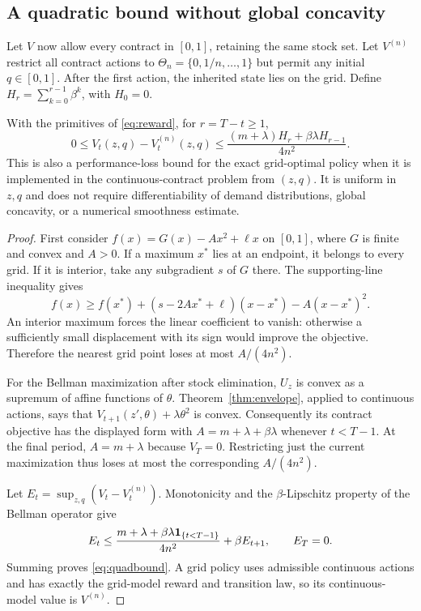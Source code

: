 \subsection{A quadratic bound without global concavity}\label{sec:grid}
Let $V$ now allow every contract in $[0,1]$, retaining the same stock set. Let $V^{(n)}$ restrict all contract actions to $\Theta_n=\{0,1/n,\ldots,1\}$ but permit any initial $q\in[0,1]$. After the first action, the inherited state lies on the grid. Define $H_r=\sum_{k=0}^{r-1}\beta^k$, with $H_0=0$.

\begin{theorem}\label{thm:quadratic}
With the primitives of \eqref{eq:reward}, for $r=T-t\geq1$,
\begin{equation}\label{eq:quadbound}
 0\leq V_t(z,q)-V_t^{(n)}(z,q)
 \leq\frac{(m+\lambda)H_r+\beta\lambda H_{r-1}}{4n^2}.
\end{equation}
This is also a performance-loss bound for the exact grid-optimal policy when it is implemented in the continuous-contract problem from $(z,q)$. It is uniform in $z,q$ and does not require differentiability of demand distributions, global concavity, or a numerical smoothness estimate.
\end{theorem}
\begin{proof}
First consider $f(x)=G(x)-A x^2+\ell x$ on $[0,1]$, where $G$ is finite and convex and $A>0$. If a maximum $x^*$ lies at an endpoint, it belongs to every grid. If it is interior, take any subgradient $s$ of $G$ there. The supporting-line inequality gives
\[
 f(x)\geq f(x^*)+(s-2Ax^*+\ell)(x-x^*)-A(x-x^*)^2.
\]
An interior maximum forces the linear coefficient to vanish: otherwise a sufficiently small displacement with its sign would improve the objective. Therefore the nearest grid point loses at most $A/(4n^2)$.

For the Bellman maximization after stock elimination, $U_z$ is convex as a supremum of affine functions of $\theta$. Theorem~\ref{thm:envelope}, applied to continuous actions, says that $V_{t+1}(z',\theta)+\lambda\theta^2$ is convex. Consequently its contract objective has the displayed form with $A=m+\lambda+\beta\lambda$ whenever $t<T-1$. At the final period, $A=m+\lambda$ because $V_T=0$. Restricting just the current maximization thus loses at most the corresponding $A/(4n^2)$.

Let $E_t=\sup_{z,q}(V_t-V_t^{(n)})$. Monotonicity and the $\beta$-Lipschitz property of the Bellman operator give
\[
 E_t\leq \frac{m+\lambda+\beta\lambda\mathbf 1_{\{t<T-1\}}}{4n^2}
                  +\beta E_{t+1},\qquad E_T=0.
\]
Summing proves \eqref{eq:quadbound}. A grid policy uses admissible continuous actions and has exactly the grid-model reward and transition law, so its continuous-model value is $V^{(n)}$.\end{proof}

